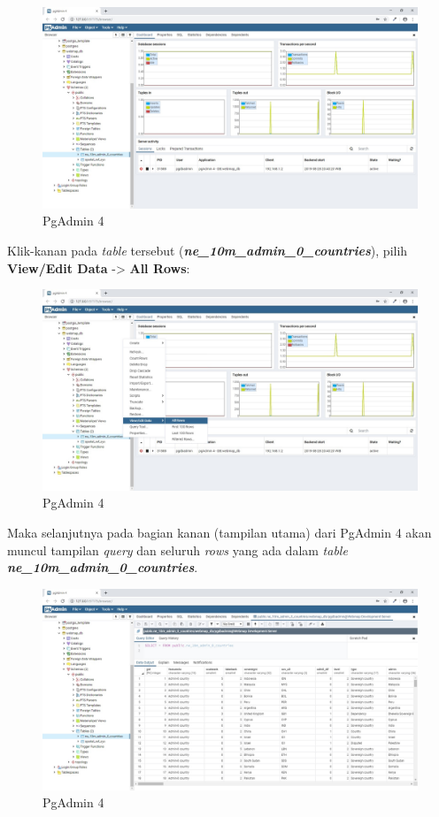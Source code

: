 \documentclass[]{book}
\begin{document}
\begin{figure}
\centering
\includegraphics{./img/pgadmin4-show-tables.jpg}
\caption{PgAdmin 4}
\end{figure}

Klik-kanan pada \emph{table} tersebut (\textbf{\emph{ne\_10m\_admin\_0\_countries}}), pilih \textbf{View/Edit Data} -\textgreater{} \textbf{All Rows}:

\begin{figure}
\centering
\includegraphics{./img/pgadmin4-right-click-on-table.jpg}
\caption{PgAdmin 4}
\end{figure}

Maka selanjutnya pada bagian kanan (tampilan utama) dari PgAdmin 4 akan muncul tampilan \emph{query} dan seluruh \emph{rows} yang ada dalam \emph{table} \textbf{\emph{ne\_10m\_admin\_0\_countries}}.

\begin{figure}
\centering
\includegraphics{./img/pgadmin4-show-all-entries.jpg}
\caption{PgAdmin 4}
\end{figure}
\end{document}
